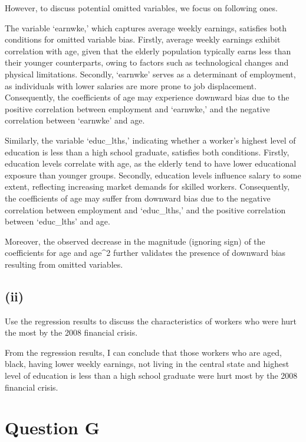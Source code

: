 \documentclass[
]{article}
\begin{document}
However, to discuss potential omitted variables, we focus on following
ones.

The variable `earnwke,' which captures average weekly earnings,
satisfies both conditions for omitted variable bias. Firstly, average
weekly earnings exhibit correlation with age, given that the elderly
population typically earns less than their younger counterparts, owing
to factors such as technological changes and physical limitations.
Secondly, `earnwke' serves as a determinant of employment, as
individuals with lower salaries are more prone to job displacement.
Consequently, the coefficients of age may experience downward bias due
to the positive correlation between employment and `earnwke,' and the
negative correlation between `earnwke' and age.

Similarly, the variable `educ\_lths,' indicating whether a worker's
highest level of education is less than a high school graduate,
satisfies both conditions. Firstly, education levels correlate with age,
as the elderly tend to have lower educational exposure than younger
groups. Secondly, education levels influence salary to some extent,
reflecting increasing market demands for skilled workers. Consequently,
the coefficients of age may suffer from downward bias due to the
negative correlation between employment and `educ\_lths,' and the
positive correlation between `educ\_lths' and age.

Moreover, the observed decrease in the magnitude (ignoring sign) of the
coefficients for age and age\^{}2 further validates the presence of
downward bias resulting from omitted variables.

\hypertarget{ii-3}{%
\subsection{(ii)}\label{ii-3}}

Use the regression results to discuss the characteristics of workers who
were hurt the most by the 2008 financial crisis. \vspace{1em}

From the regression results, I can conclude that those workers who are
aged, black, having lower weekly earnings, not living in the central
state and highest level of education is less than a high school graduate
were hurt most by the 2008 financial crisis.

\hypertarget{question-g}{%
\section{Question G}\label{question-g}}
\end{document}
